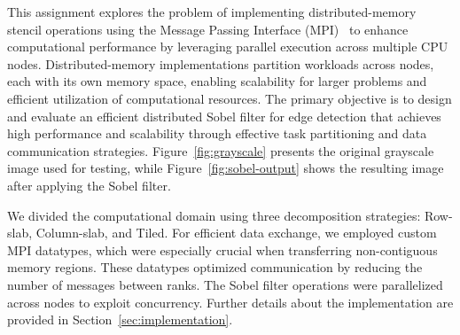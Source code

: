 






This assignment explores the problem of implementing distributed-memory stencil operations using the Message Passing Interface (MPI)~\cite{mpi_spec} to enhance computational performance by leveraging parallel execution across multiple CPU nodes. Distributed-memory implementations partition workloads across nodes, each with its own memory space, enabling scalability for larger problems and efficient utilization of computational resources. The primary objective is to design and evaluate an efficient distributed Sobel filter for edge detection that achieves high performance and scalability through effective task partitioning and data communication strategies. Figure~\ref{fig:grayscale} presents the original grayscale image used for testing, while Figure~\ref{fig:sobel-output} shows the resulting image after applying the Sobel filter.

We divided the computational domain using three decomposition strategies: Row-slab, Column-slab, and Tiled. For efficient data exchange, we employed custom MPI datatypes, which were especially crucial when transferring non-contiguous memory regions. These datatypes optimized communication by reducing the number of messages between ranks. The Sobel filter operations were parallelized across nodes to exploit concurrency. Further details about the implementation are provided in Section~\ref{sec:implementation}.

